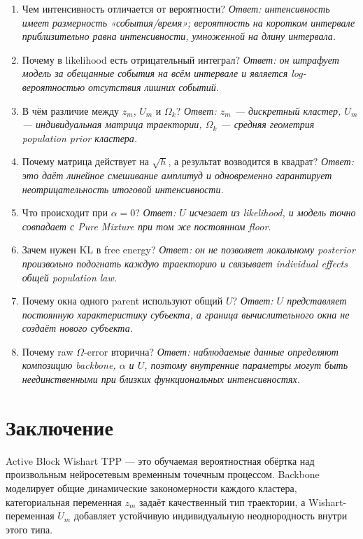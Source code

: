 \documentclass[12pt,a4paper]{article}
\begin{document}
\begin{enumerate}
\item Чем интенсивность отличается от вероятности? \textit{Ответ: интенсивность имеет размерность «события/время»; вероятность на коротком интервале приблизительно равна интенсивности, умноженной на длину интервала.}
\item Почему в likelihood есть отрицательный интеграл? \textit{Ответ: он штрафует модель за обещанные события на всём интервале и является log-вероятностью отсутствия лишних событий.}
\item В чём различие между \(z_m\), \(U_m\) и \(\Omega_k\)? \textit{Ответ: \(z_m\) --- дискретный кластер, \(U_m\) --- индивидуальная матрица траектории, \(\Omega_k\) --- средняя геометрия population prior кластера.}
\item Почему матрица действует на \(\sqrt h\), а результат возводится в квадрат? \textit{Ответ: это даёт линейное смешивание амплитуд и одновременно гарантирует неотрицательность итоговой интенсивности.}
\item Что происходит при \(\alpha=0\)? \textit{Ответ: \(U\) исчезает из likelihood, и модель точно совпадает с Pure Mixture при том же постоянном floor.}
\item Зачем нужен KL в free energy? \textit{Ответ: он не позволяет локальному posterior произвольно подогнать каждую траекторию и связывает individual effects общей population law.}
\item Почему окна одного parent используют общий \(U\)? \textit{Ответ: \(U\) представляет постоянную характеристику субъекта, а граница вычислительного окна не создаёт нового субъекта.}
\item Почему raw \(\Omega\)-error вторична? \textit{Ответ: наблюдаемые данные определяют композицию backbone, \(\alpha\) и \(U\), поэтому внутренние параметры могут быть неединственными при близких функциональных интенсивностях.}
\end{enumerate}

\section{Заключение}

Active Block Wishart TPP --- это обучаемая вероятностная обёртка над произвольным нейросетевым временным точечным процессом. Backbone моделирует общие динамические закономерности каждого кластера, категориальная переменная \(z_m\) задаёт качественный тип траектории, а Wishart-переменная \(U_m\) добавляет устойчивую индивидуальную неоднородность внутри этого типа.
\end{document}
